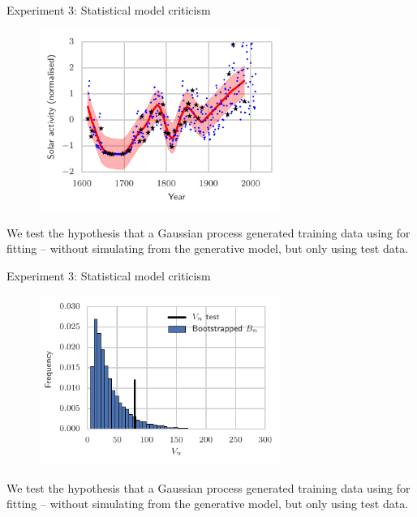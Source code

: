 \documentclass{beamer}
\begin{document}
    \begin{frame}{Experiment 3: Statistical model criticism}
        \begin{figure}
           \includegraphics[width= 0.7\textwidth]{img/gp_regression_data_fit.pdf}  
        \end{figure}
      We test the hypothesis that a Gaussian process generated {\color{red}training data} using for fitting -- without simulating from the generative model, but only using {\color{blue} test data}.

  \end{frame}


   \begin{frame}{Experiment 3: Statistical model criticism}
        \begin{figure}
           \includegraphics[width=0.7\textwidth]{img/gp_regression_bootstrap_hist} 
        \end{figure}
      We test the hypothesis that a Gaussian process generated {\color{red}training data} using for fitting -- without simulating from the generative model, but only using {\color{blue} test data}.

  \end{frame}
\end{document}
